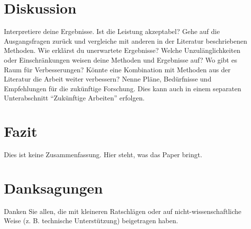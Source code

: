 \documentclass[a4paper, 11pt]{IEEEtran}
\begin{document}

 \section{Diskussion}
 
 Interpretiere deine Ergebnisse. Ist die Leistung akzeptabel? Gehe auf die Ausgangsfragen zurück und vergleiche mit anderen in der Literatur beschriebenen Methoden. Wie erklärst du unerwartete Ergebnisse? Welche Unzulänglichkeiten oder Einschränkungen weisen deine Methoden und Ergebnisse auf? Wo gibt es Raum für Verbesserungen? Könnte eine Kombination mit Methoden aus der Literatur die Arbeit weiter verbessern? Nenne Pläne, Bedürfnisse und Empfehlungen für die zukünftige Forschung. Dies kann auch in einem separaten Unterabschnitt ``Zukünftige Arbeiten'' erfolgen.


\section{Fazit}
Dies ist keine Zusammenfassung. Hier steht, was das Paper bringt.



\section*{Danksagungen}
Danken Sie allen, die mit kleineren Ratschlägen oder auf nicht-wissenschaftliche Weise (z. B. technische Unterstützung) beigetragen haben.



\end{document}
